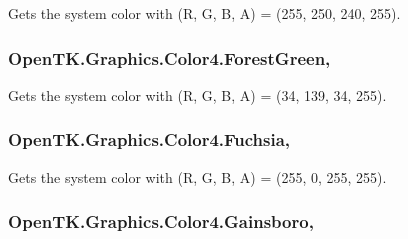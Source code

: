 Gets the system color with (R, G, B, A) = (255, 250, 240, 255). 

\hypertarget{struct_open_t_k_1_1_graphics_1_1_color4_a6006dd8d72d9fb266105d13df1f194bd}{
\subsubsection[{Forest\-Green}]{ Open\-T\-K.\-Graphics.\-Color4.\-Forest\-Green\hspace{0.3cm}{\ttfamily [static]}, {\ttfamily [get]}}}\label{struct_open_t_k_1_1_graphics_1_1_color4_a6006dd8d72d9fb266105d13df1f194bd}


Gets the system color with (R, G, B, A) = (34, 139, 34, 255). 

\hypertarget{struct_open_t_k_1_1_graphics_1_1_color4_a557f6e1a943dc109404a56e67724e34d}{
\subsubsection[{Fuchsia}]{ Open\-T\-K.\-Graphics.\-Color4.\-Fuchsia\hspace{0.3cm}{\ttfamily [static]}, {\ttfamily [get]}}}\label{struct_open_t_k_1_1_graphics_1_1_color4_a557f6e1a943dc109404a56e67724e34d}


Gets the system color with (R, G, B, A) = (255, 0, 255, 255). 

\hypertarget{struct_open_t_k_1_1_graphics_1_1_color4_ae64cbff19f726db10e65784bfa7acdd9}{
\subsubsection[{Gainsboro}]{ Open\-T\-K.\-Graphics.\-Color4.\-Gainsboro\hspace{0.3cm}{\ttfamily [static]}, {\ttfamily [get]}}}\label{struct_open_t_k_1_1_graphics_1_1_color4_ae64cbff19f726db10e65784bfa7acdd9}


